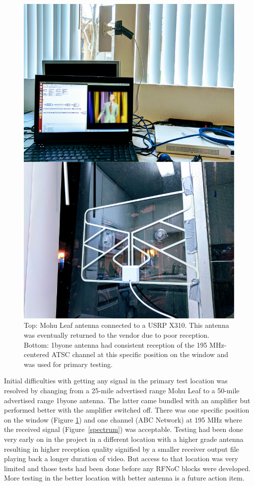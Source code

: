 \documentclass{article}
\begin{document}
\begin{figure}[h]
\begin{center}
    	\centerline{\includegraphics[width=\columnwidth]{antenna_blur.png}}
    \fi
    \caption{Top: Mohu Leaf antenna connected to a USRP X310. This antenna was eventually returned to the vendor due to poor reception. Bottom: 1byone antenna had consistent reception of the 195 MHz-centered ATSC channel at this specific position on the window and was used for primary testing.}
    \label{antenna}
  \end{center}
\end{figure}

Initial difficulties with getting any signal in the primary test location was resolved by changing from a 25-mile advertised range Mohu Leaf to a 50-mile advertised range 1byone antenna. The latter came bundled with an amplifier but performed better with the amplifier switched off. There was one specific position on the window (Figure \ref{antenna}) and one channel (ABC Network) at 195 MHz where the received signal (Figure~\ref{spectrum}) was acceptable. Testing had been done very early on in the project in a different location with a higher grade antenna resulting in higher reception quality signified by a smaller receiver output file playing back a longer duration of video. But access to that location was very limited and those tests had been done before any RFNoC blocks were developed. More testing in the better location with better antenna is a future action item.
\end{document}
